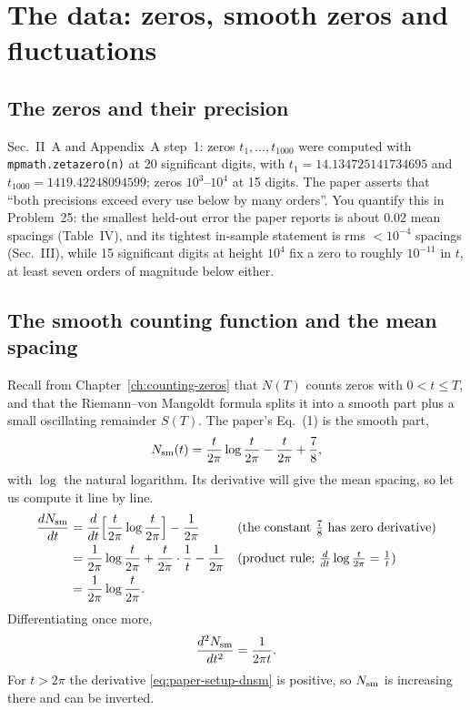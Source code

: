 \section{The data: zeros, smooth zeros and fluctuations}\label{sec:paper-setup-data}

\subsection{The zeros and their precision}

Sec.~II~A and Appendix~A step~1: zeros $t_1,\dots,t_{1000}$ were computed with \texttt{mpmath.zetazero(n)} at 20 significant digits, with $t_1=14.134725141734695$ and $t_{1000}=1419.42248094599$; zeros $10^3$--$10^4$ at 15 digits. The paper asserts that ``both precisions exceed every use below by many orders''. You quantify this in Problem~25: the smallest held-out error the paper reports is about 0.02 mean spacings (Table~IV), and its tightest in-sample statement is rms $<10^{-4}$ spacings (Sec.~III), while 15 significant digits at height $10^4$ fix a zero to roughly $10^{-11}$ in $t$, at least seven orders of magnitude below either.

\subsection{The smooth counting function and the mean spacing}

Recall from Chapter~\ref{ch:counting-zeros} that $N(T)$ counts zeros with $0<t\le T$, and that the Riemann--von Mangoldt formula splits it into a smooth part plus a small oscillating remainder $S(T)$. The paper's Eq.~(1) is the smooth part,
\begin{equation}
N_{\mathrm{sm}}(t)=\frac{t}{2\pi}\log\frac{t}{2\pi}-\frac{t}{2\pi}+\frac78 ,
\label{eq:paper-setup-nsm}
\end{equation}
with $\log$ the natural logarithm. Its derivative will give the mean spacing, so let us compute it line by line.
\begin{align}
\frac{dN_{\mathrm{sm}}}{dt}&=\frac{d}{dt}\Bigl[\frac{t}{2\pi}\log\frac{t}{2\pi}\Bigr]-\frac{1}{2\pi}
&&\text{(the constant $\tfrac78$ has zero derivative)}\nonumber\\
&=\frac{1}{2\pi}\log\frac{t}{2\pi}+\frac{t}{2\pi}\cdot\frac{1}{t}-\frac{1}{2\pi}
&&\text{(product rule; $\tfrac{d}{dt}\log\tfrac{t}{2\pi}=\tfrac1t$)}\nonumber\\
&=\frac{1}{2\pi}\log\frac{t}{2\pi}. \label{eq:paper-setup-dnsm}
\end{align}
Differentiating once more,
\begin{equation}
\frac{d^2N_{\mathrm{sm}}}{dt^2}=\frac{1}{2\pi t}.
\label{eq:paper-setup-d2nsm}
\end{equation}
For $t>2\pi$ the derivative \eqref{eq:paper-setup-dnsm} is positive, so $N_{\mathrm{sm}}$ is increasing there and can be inverted.

